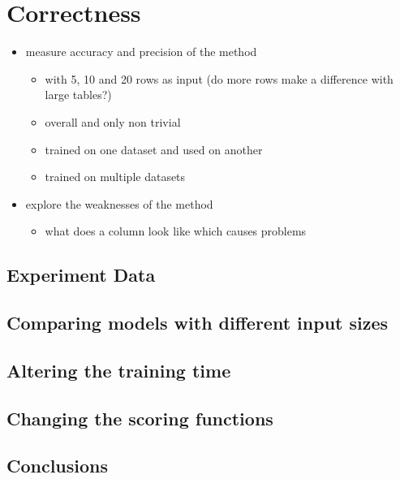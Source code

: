 \section{Correctness}
\begin{itemize}
  \item measure accuracy and precision of the method
        \begin{itemize}
          \item with 5, 10 and 20 rows as input (do more rows make a difference with large tables?)
          \item overall and only non trivial
          \item trained on one dataset and used on another
          \item trained on multiple datasets
        \end{itemize}
  \item explore the weaknesses of the method
        \begin{itemize}
          \item what does a column look like which causes problems
        \end{itemize}
\end{itemize}

\subsection{Experiment Data}

\subsection{Comparing models with different input sizes}

\subsection{Altering the training time}

\subsection{Changing the scoring functions}

\subsection{Conclusions}
